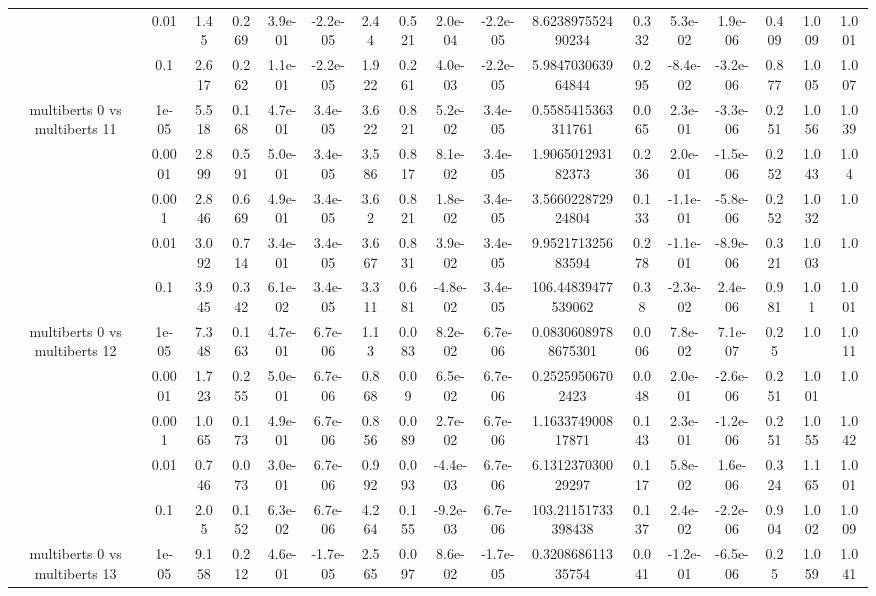 \begin{tabular}{|c|c|c|c|c|c|c|c|c|c|c|c|c|c|c|c|c|}
 & 0.01 & 1.45 & 0.269 & 3.9e-01 & -2.2e-05 & 2.44 & 0.521 & 2.0e-04 & -2.2e-05 & 8.623897552490234 & 0.332 & 5.3e-02 & 1.9e-06 & 0.409 & 1.009 & 1.001 \\
 & 0.1 & 2.617 & 0.262 & 1.1e-01 & -2.2e-05 & 1.922 & 0.261 & 4.0e-03 & -2.2e-05 & 5.984703063964844 & 0.295 & -8.4e-02 & -3.2e-06 & 0.877 & 1.005 & 1.007 \\
\hline
\multirow{5}{*}{multiberts 0 vs multiberts 11} & 1e-05 & 5.518 & 0.168 & 4.7e-01 & 3.4e-05 & 3.622 & 0.821 & 5.2e-02 & 3.4e-05 & 0.5585415363311761 & 0.065 & 2.3e-01 & -3.3e-06 & 0.251 & 1.056 & 1.039 \\
 & 0.0001 & 2.899 & 0.591 & 5.0e-01 & 3.4e-05 & 3.586 & 0.817 & 8.1e-02 & 3.4e-05 & 1.906501293182373 & 0.236 & 2.0e-01 & -1.5e-06 & 0.252 & 1.043 & 1.04 \\
 & 0.001 & 2.846 & 0.669 & 4.9e-01 & 3.4e-05 & 3.62 & 0.821 & 1.8e-02 & 3.4e-05 & 3.566022872924804 & 0.133 & -1.1e-01 & -5.8e-06 & 0.252 & 1.032 & 1.0 \\
 & 0.01 & 3.092 & 0.714 & 3.4e-01 & 3.4e-05 & 3.667 & 0.831 & 3.9e-02 & 3.4e-05 & 9.952171325683594 & 0.278 & -1.1e-01 & -8.9e-06 & 0.321 & 1.003 & 1.0 \\
 & 0.1 & 3.945 & 0.342 & 6.1e-02 & 3.4e-05 & 3.311 & 0.681 & -4.8e-02 & 3.4e-05 & 106.44839477539062 & 0.38 & -2.3e-02 & 2.4e-06 & 0.981 & 1.01 & 1.001 \\
\hline
\multirow{5}{*}{multiberts 0 vs multiberts 12} & 1e-05 & 7.348 & 0.163 & 4.7e-01 & 6.7e-06 & 1.13 & 0.083 & 8.2e-02 & 6.7e-06 & 0.08306089788675301 & 0.006 & 7.8e-02 & 7.1e-07 & 0.25 & 1.0 & 1.011 \\
 & 0.0001 & 1.723 & 0.255 & 5.0e-01 & 6.7e-06 & 0.868 & 0.09 & 6.5e-02 & 6.7e-06 & 0.25259506702423 & 0.048 & 2.0e-01 & -2.6e-06 & 0.251 & 1.001 & 1.0 \\
 & 0.001 & 1.065 & 0.173 & 4.9e-01 & 6.7e-06 & 0.856 & 0.089 & 2.7e-02 & 6.7e-06 & 1.163374900817871 & 0.143 & 2.3e-01 & -1.2e-06 & 0.251 & 1.055 & 1.042 \\
 & 0.01 & 0.746 & 0.073 & 3.0e-01 & 6.7e-06 & 0.992 & 0.093 & -4.4e-03 & 6.7e-06 & 6.131237030029297 & 0.117 & 5.8e-02 & 1.6e-06 & 0.324 & 1.165 & 1.001 \\
 & 0.1 & 2.05 & 0.152 & 6.3e-02 & 6.7e-06 & 4.264 & 0.155 & -9.2e-03 & 6.7e-06 & 103.21151733398438 & 0.137 & 2.4e-02 & -2.2e-06 & 0.904 & 1.002 & 1.009 \\
\hline
\multirow{5}{*}{multiberts 0 vs multiberts 13} & 1e-05 & 9.158 & 0.212 & 4.6e-01 & -1.7e-05 & 2.565 & 0.097 & 8.6e-02 & -1.7e-05 & 0.320868611335754 & 0.041 & -1.2e-01 & -6.5e-06 & 0.25 & 1.059 & 1.041 \\

\end{tabular}
